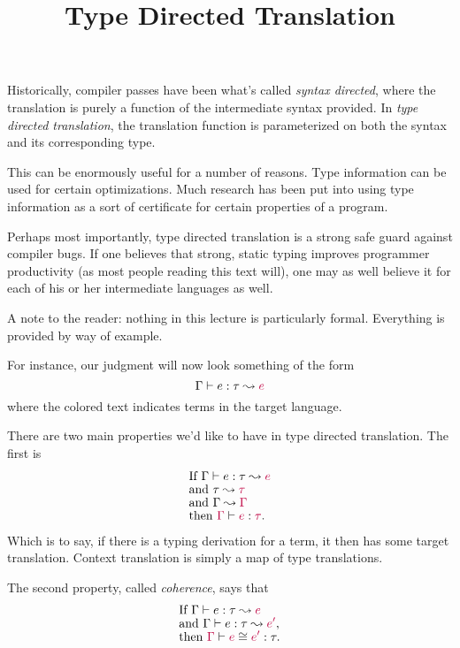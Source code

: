 \documentclass{amsart}
\title{Type Directed Translation}
\newcommand{\target}[1]{{\color{purple}#1}}
\begin{document}
\maketitle

Historically, compiler passes have been what's called \textit{syntax directed},
where the translation is purely a function of the intermediate syntax provided.
In \textit{type directed translation}, the translation function is
parameterized on both the syntax and its corresponding type.

This can be enormously useful for a number of reasons. Type information can be
used for certain optimizations. Much research has been put into using type
information as a sort of certificate for certain properties of a program.

Perhaps most importantly, type directed translation is a strong safe guard
against compiler bugs. If one believes that strong, static typing improves
programmer productivity (as most people reading this text will), one may as
well believe it for each of his or her intermediate languages as well.

A note to the reader: nothing in this lecture is particularly formal.
Everything is provided by way of example.

For instance, our judgment will now look something of the form
\[
\Gamma \vdash e:\tau \leadsto \target{e}
\]
where the \target{colored} text indicates terms in the target language.

There are two main properties we'd like to have in type directed translation.
The first is
\begin{align*}
&\text{If }\Gamma \vdash e : \tau \leadsto \target{e}\\[-1ex]
&\text{and }\tau \leadsto \target{\tau} \\[-1ex]
&\text{and }\Gamma \leadsto \target{\Gamma} \\[-1ex]
&\text{then }\target{\Gamma} \vdash \target{e} : \target{\tau}.
\end{align*}
Which is to say, if there is a typing derivation for a term, it then has some
target translation. Context translation is simply a map of type translations.

The second property, called \textit{coherence}, says that
\begin{align*}
&\text{If }\Gamma \vdash e : \tau \leadsto \target{e} \\[-1ex]
&  \text{and }\Gamma \vdash e : \tau \leadsto \target{e'}, \\[-1ex]
&  \text{then }\target{\Gamma} \vdash \target{e} \cong \target{e'} : \tau.
\end{align*}
\end{document}
